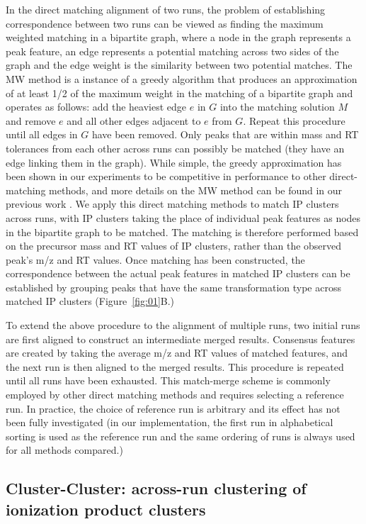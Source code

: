 In the direct matching alignment of two runs, the problem of establishing correspondence between two runs can be viewed as finding the maximum weighted matching in a bipartite graph, where a node in the graph represents a peak feature, an edge represents a potential matching across two sides of the graph and the edge weight is the similarity between two potential matches. The MW method \cite{Wandy2015} is a instance of a greedy algorithm that produces an approximation of at least 1/2 of the maximum weight in the matching of a bipartite graph \cite{Maximum2011} and operates as follows: add the heaviest edge $e$ in $G$ into the matching solution $M$ and remove $e$ and all other edges adjacent to $e$ from $G$. Repeat this procedure until all edges in $G$ have been removed. Only peaks that are within mass and RT tolerances from each other across runs can possibly be matched (they have an edge linking them in the graph). While simple, the greedy approximation has been shown in our experiments to be competitive in performance to other direct-matching methods, and more details on the MW method can be found in our previous work \cite{Wandy2015}. We apply this direct matching methods to match IP clusters across runs, with IP clusters taking the place of individual peak features as nodes in the bipartite graph to be matched. The matching is therefore performed based on the precursor mass and RT values of IP clusters, rather than the observed peak's m/z and RT values. Once matching has been constructed, the correspondence between the actual peak features in matched IP clusters can be established by grouping peaks that have the same transformation type across matched IP clusters (Figure~\ref{fig:01}B.)

To extend the above procedure to the alignment of multiple runs, two initial runs are first aligned to construct an intermediate merged results. Consensus features are created by taking the average m/z and RT values of matched features, and the next run is then aligned to the merged results. This procedure is repeated until all runs have been exhausted. This match-merge scheme is commonly employed by other direct matching methods \cite{Voss2011a, Pluskal2010} and requires selecting a reference run. In practice, the choice of reference run is arbitrary and its effect has not been fully investigated (in our implementation, the first run in alphabetical sorting is used as the reference run and the same ordering of runs is always used for all methods compared.)

\subsection{Cluster-Cluster: across-run clustering of ionization product clusters\label{sub:cluster-cluster}}

